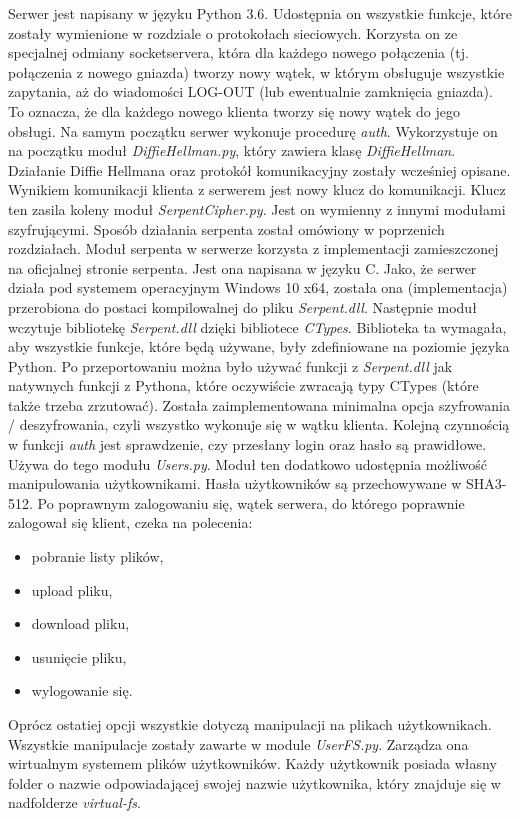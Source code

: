 \documentclass{article}
\begin{document}
	Serwer jest napisany w języku Python 3.6. Udostępnia on wszystkie funkcje, które zostały wymienione w rozdziale o protokołach sieciowych. Korzysta on ze specjalnej odmiany socketservera, która dla każdego nowego połączenia (tj. połączenia z nowego gniazda) tworzy nowy wątek, w którym obsługuje wszystkie zapytania, aż do wiadomości LOG-OUT (lub ewentualnie zamknięcia gniazda). To oznacza, że dla każdego nowego klienta tworzy się nowy wątek do jego obsługi. Na samym początku serwer wykonuje procedurę \textit{auth}. Wykorzystuje on na początku moduł \textit{DiffieHellman.py}, który zawiera klasę \textit{DiffieHellman}. Działanie Diffie Hellmana oraz protokół komunikacyjny zostały wcześniej opisane. Wynikiem komunikacji klienta z serwerem jest nowy klucz do komunikacji. Klucz ten zasila koleny moduł \textit{SerpentCipher.py}. Jest on wymienny z innymi modułami szyfrującymi. Sposób działania serpenta został omówiony w poprzenich rozdziałach. Moduł serpenta w serwerze korzysta z implementacji zamieszczonej na oficjalnej stronie serpenta. Jest ona napisana w języku C. Jako, że serwer działa pod systemem operacyjnym Windows 10 x64, została ona (implementacja) przerobiona do postaci kompilowalnej do pliku \textit{Serpent.dll}. Następnie moduł wczytuje bibliotekę \textit{Serpent.dll} dzięki bibliotece \textit{CTypes}. Biblioteka ta wymagała, aby wszystkie funkcje, które będą używane, były zdefiniowane na poziomie języka Python. Po przeportowaniu można było używać funkcji z \textit{Serpent.dll} jak natywnych funkcji z Pythona, które oczywiście zwracają typy CTypes (które także trzeba zrzutować). Została zaimplementowana minimalna opcja szyfrowania / deszyfrowania, czyli wszystko wykonuje się w wątku klienta.
	Kolejną czynnością w funkcji \textit{auth} jest sprawdzenie, czy przesłany login oraz hasło są prawidłowe. Używa do tego modułu \textit{Users.py}. Moduł ten dodatkowo udostępnia możliwość manipulowania użytkownikami. Hasła użytkowników są przechowywane w SHA3-512. Po poprawnym zalogowaniu się, wątek serwera, do którego poprawnie zalogował się klient, czeka na polecenia:
	\begin{itemize}
		\item pobranie listy plików,
		\item upload pliku,
		\item download pliku,
		\item usunięcie pliku,
		\item wylogowanie się.
	\end{itemize}

	Oprócz ostatiej opcji wszystkie dotyczą manipulacji na plikach użytkownikach. Wszystkie manipulacje zostały zawarte w module \textit{UserFS.py}. Zarządza ona wirtualnym systemem plików użytkowników. Każdy użytkownik posiada własny folder o nazwie odpowiadającej swojej nazwie użytkownika, który znajduje się w nadfolderze \textit{virtual-fs}. 
\end{document}
